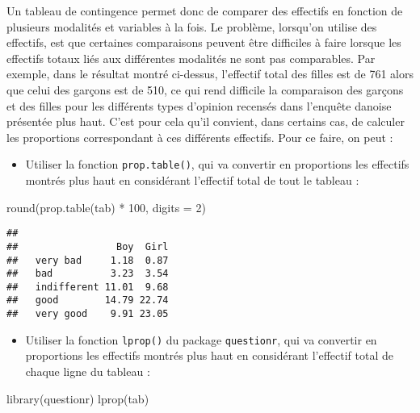\documentclass[
]{book}
\newenvironment{Shaded}{\begin{snugshade}}{\end{snugshade}}
\newcommand{\AttributeTok}[1]{\textcolor[rgb]{0.77,0.63,0.00}{#1}}
\newcommand{\DecValTok}[1]{\textcolor[rgb]{0.00,0.00,0.81}{#1}}
\newcommand{\FunctionTok}[1]{\textcolor[rgb]{0.00,0.00,0.00}{#1}}
\newcommand{\NormalTok}[1]{#1}
\newcommand{\SpecialCharTok}[1]{\textcolor[rgb]{0.00,0.00,0.00}{#1}}
\providecommand{\tightlist}{%
  \setlength{\itemsep}{0pt}\setlength{\parskip}{0pt}}
\begin{document}
Un tableau de contingence permet donc de comparer des effectifs en fonction de plusieurs modalités et variables à la fois. Le problème, lorsqu'on utilise des effectifs, est que certaines comparaisons peuvent être difficiles à faire lorsque les effectifs totaux liés aux différentes modalités ne sont pas comparables. Par exemple, dans le résultat montré ci-dessus, l'effectif total des filles est de 761 alors que celui des garçons est de 510, ce qui rend difficile la comparaison des garçons et des filles pour les différents types d'opinion recensés dans l'enquête danoise présentée plus haut. C'est pour cela qu'il convient, dans certains cas, de calculer les proportions correspondant à ces différents effectifs. Pour ce faire, on peut :

\begin{itemize}
\tightlist
\item
  Utiliser la fonction \texttt{prop.table()}, qui va convertir en proportions les effectifs montrés plus haut en considérant l'effectif total de tout le tableau :
\end{itemize}

\begin{Shaded}
\begin{Highlighting}[]
\FunctionTok{round}\NormalTok{(}\FunctionTok{prop.table}\NormalTok{(tab) }\SpecialCharTok{*} \DecValTok{100}\NormalTok{, }\AttributeTok{digits =} \DecValTok{2}\NormalTok{)}
\end{Highlighting}
\end{Shaded}

\begin{verbatim}
##              
##                 Boy  Girl
##   very bad     1.18  0.87
##   bad          3.23  3.54
##   indifferent 11.01  9.68
##   good        14.79 22.74
##   very good    9.91 23.05
\end{verbatim}

\begin{itemize}
\tightlist
\item
  Utiliser la fonction \texttt{lprop()} du package \texttt{questionr}, qui va convertir en proportions les effectifs montrés plus haut en considérant l'effectif total de chaque ligne du tableau :
\end{itemize}

\begin{Shaded}
\begin{Highlighting}[]
\FunctionTok{library}\NormalTok{(questionr)}
\FunctionTok{lprop}\NormalTok{(tab)}
\end{Highlighting}
\end{Shaded}
\end{document}
